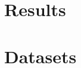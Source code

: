 \documentclass[11pt]{article}
\begin{document}
\section{Results}


\section{Datasets}



 
\end{document}
